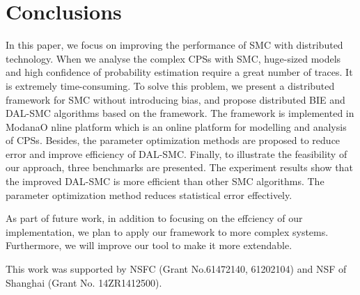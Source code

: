 \section{Conclusions}
In this paper, we focus on improving the performance of SMC with distributed technology. When we analyse the complex CPSs with SMC, huge-sized models and high confidence of probability estimation require a great number of traces. It is extremely time-consuming. To solve this problem, we present a distributed framework for SMC without introducing bias, and propose distributed BIE and DAL-SMC algorithms based on the framework. The framework is implemented in ModanaO
nline platform which is an online platform for modelling and analysis of CPSs. Besides, the parameter optimization methods are proposed to reduce error and improve efficiency of DAL-SMC. Finally, to illustrate the feasibility of our approach, three benchmarks are presented. The experiment results show that the improved DAL-SMC is more efficient than other SMC algorithms. The parameter optimization method reduces statistical error effectively. 

As part of future work, in addition to focusing on the effciency of our implementation, we plan to apply our framework to more complex systems. Furthermore, we will improve our tool to make it more extendable.

\begin{acknowledgements}

This work was supported by NSFC (Grant No.61472140, 61202104) and NSF of Shanghai (Grant No. 14ZR1412500).

\end{acknowledgements}


